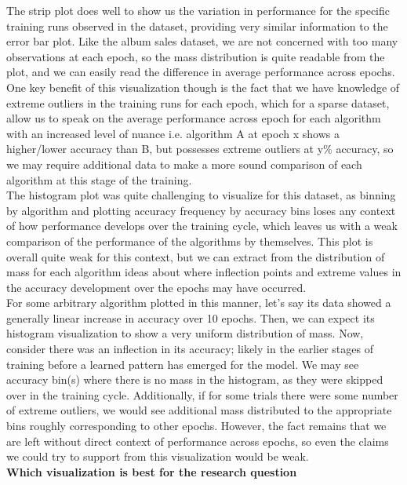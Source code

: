 The strip plot does well to show us the variation in performance for the specific training runs observed in the dataset, providing very similar information to the error bar plot. Like the album sales dataset, we are not concerned with too many observations at each epoch, so the mass distribution is quite readable from the plot, and we can easily read the difference in average performance across epochs. One key benefit of this visualization though is the fact that we have knowledge of extreme outliers in the training runs for each epoch, which for a sparse dataset, allow us to speak on the average performance across epoch for each algorithm with an increased level of nuance i.e. algorithm A at epoch x shows a higher/lower accuracy than B, but possesses extreme outliers at y\% accuracy, so we may require additional data to make a more sound comparison of each algorithm at this stage of the training.\\

The histogram plot was quite challenging to visualize for this dataset, as binning by algorithm and plotting accuracy frequency by accuracy bins loses any context of how performance develops over the training cycle, which leaves us with a weak comparison of the performance of the algorithms by themselves. This plot is overall quite weak for this context, but we can extract from the distribution of mass for each algorithm ideas about where inflection points and extreme values in the accuracy development over the epochs may have occurred.\\ 

For some arbitrary algorithm plotted in this manner, let's say its data showed a generally linear increase in accuracy over 10 epochs. Then, we can expect its histogram visualization to show a very uniform distribution of mass. Now, consider there was an inflection in its accuracy; likely in the earlier stages of training before a learned pattern has emerged for the model. We may see accuracy bin(s) where there is no mass in the histogram, as they were skipped over in the training cycle. Additionally, if for some trials there were some number of extreme outliers, we would see additional mass distributed to the appropriate bins roughly corresponding to other epochs. However, the fact remains that we are left without direct context of performance across epochs, so even the claims we could try to support from this visualization would be weak.\\

\textbf{Which visualization is best for the research question}\\

